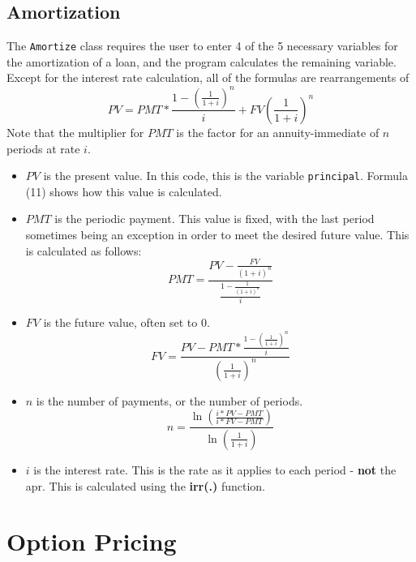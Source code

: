 \documentclass[10pt]{article}
\begin{document}
\subsection{Amortization}
The \texttt{Amortize} class requires the user to enter 4 of the 5 necessary variables for the amortization
of a loan, and the program calculates the remaining variable. Except for the interest rate calculation, all
of the formulas are rearrangements of\\
\begin{equation}
    PV = PMT*\frac{1-(\frac{1}{1+i})^n}{i} + FV\left(\frac{1}{1+i}\right)^n
\end{equation}
Note that the multiplier for $PMT$ is the factor for an annuity-immediate of $n$ periods at rate $i$.
\begin{itemize}
    \item $PV$ is the present value. In this code, this is the variable \texttt{principal}. Formula (11)
        shows how this value is calculated.
    \item $PMT$ is the periodic payment. This value is fixed, with the last period sometimes being an
        exception in order to meet the desired future value. This is calculated as follows:
        \begin{equation}
            PMT = \frac{PV-\frac{FV}{(1+i)^n}}{\frac{1-\frac{1}{(1+i)^n}}{i}}
        \end{equation}
    \item $FV$ is the future value, often set to 0.
        \begin{equation}
            FV = \frac{PV-PMT*\frac{1-(\frac{1}{1+i})^n}{i}}{\left(\frac{1}{1+i}\right)^n}
        \end{equation}
    \item $n$ is the number of payments, or the number of periods.
        \begin{equation}
            n = \frac{\ln(\frac{i*PV-PMT}{i*FV-PMT})}{\ln(\frac{1}{1+i})}
        \end{equation}
    \item $i$ is the interest rate. This is the rate as it applies to each period - \textbf{not}
        the apr. This is calculated using the \textbf{irr(.)} function.
\end{itemize}


\section{Option Pricing}
\end{document}
